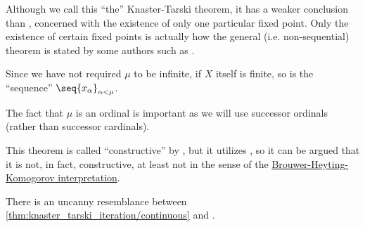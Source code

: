\begin{comments}
  \item Although we call this \enquote{the} Knaster-Tarski theorem, it has a weaker conclusion than , concerned with the existence of only one particular fixed point. Only the existence of certain fixed points is actually how the general (i.e. non-sequential) theorem is stated by some authors such as \textcite[50]{DaveyPriestley2002LatticeTheory}.

  \item Since we have not required \( \mu \) to be infinite, if \( X \) itself is finite, so is the \enquote{sequence} \( \seq{ x_\alpha }_{\alpha < \mu} \).

  \item The fact that \( \mu \) is an ordinal is important as we will use successor ordinals (rather than successor cardinals).

  \item This theorem is called \enquote{constructive} by \textcite{Echenique2005TarskiFixedPointTheorem}, but it utilizes , so it can be argued that it is not, in fact, constructive, at least not in the sense of the \hyperref[con:brouwer_heyting_kolmogorov_interpretation]{Brouwer-Heyting-Komogorov interpretation}.

  \item There is an uncanny resemblance between \cref{thm:knaster_tarski_iteration/continuous} and .
\end{comments}
